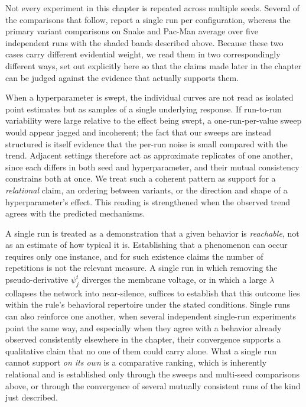 Not every experiment in this chapter is repeated across multiple seeds. Several
of the comparisons that follow, report a single run per configuration, whereas the primary variant
comparisons on Snake and Pac-Man average over five independent runs with
the shaded bands described above. Because these two cases carry different
evidential weight, we read them in two correspondingly different ways, set out
explicitly here so that the claims made later in the chapter can be judged
against the evidence that actually supports them.

When a hyperparameter is swept, the individual curves are not read as isolated
point estimates but as samples of a single underlying response. If run-to-run
variability were large relative to the effect being swept, a one-run-per-value
sweep would appear jagged and incoherent; the fact that our sweeps are instead structured is itself evidence that the per-run noise is small compared with the trend.
Adjacent settings therefore act as approximate replicates of one another, since
each differs in both seed and hyperparameter, and their mutual consistency
constrains both at once. We treat such a coherent pattern as support for a
\emph{relational} claim, an ordering between variants, or the direction and
shape of a hyperparameter's effect. This reading is strengthened when the
observed trend agrees with the predicted mechanisms.

A single run is treated as a demonstration that a given behavior is
\emph{reachable}, not as an estimate of how typical it is. Establishing that a
phenomenon can occur requires only one instance, and for such existence claims
the number of repetitions is not the relevant measure. A single run in which
removing the pseudo-derivative $\psi_j^t$ diverges the membrane voltage, or in
which a large $\lambda$ collapses the network into near-silence, suffices to
establish that this outcome lies within the rule's behavioral repertoire under
the stated conditions. Single runs can also reinforce one another, when several
independent single-run experiments point the same way, and especially when they
agree with a behavior already observed consistently elsewhere in the chapter,
their convergence supports a qualitative claim that no one of them could carry
alone. What a single run cannot support \emph{on its own} is a comparative ranking,
which is inherently relational and is established only through the sweeps and
multi-seed comparisons above, or through the convergence of several mutually
consistent runs of the kind just described.

